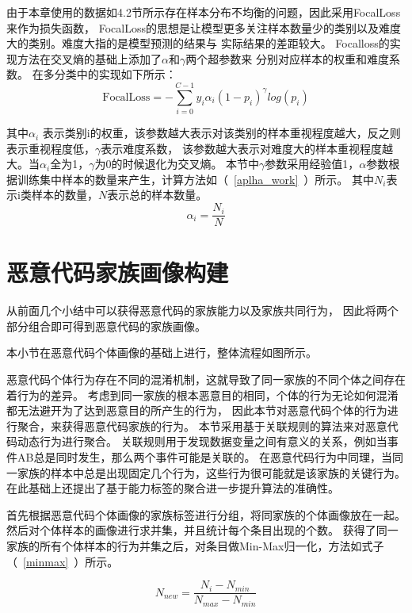 由于本章使用的数据如4.2节所示存在样本分布不均衡的问题，因此采用FocalLoss来作为损失函数，
FocalLoss的思想是让模型更多关注样本数量少的类别以及难度大的类别。难度大指的是模型预测的结果与
实际结果的差距较大。
Focalloss的实现方法在交叉熵的基础上添加了$\alpha$和$\gamma$两个超参数来
分别对应样本的权重和难度系数。
在多分类中的实现如下所示：
\begin{equation}
	\label{focalloss}
	\text{FocalLoss} = -\sum_{i=0}^{C-1}y_i \alpha_i (1-p_i)^{\gamma}log(p_i)
\end{equation}

其中$\alpha_i$ 表示类别i的权重，该参数越大表示对该类别的样本重视程度越大，反之则表示重视程度低，$\gamma$表示难度系数，
该参数越大表示对难度大的样本重视程度越大。当$\alpha_i$全为1，$\gamma$为0的时候退化为交叉熵。
本节中$\gamma$参数采用经验值1，$\alpha$参数根据训练集中样本的数量来产生，计算方法如（~\ref{aplha_work}~）所示。
其中$N_i$表示i类样本的数量，$N$表示总的样本数量。
\begin{equation}
	\label{aplha_work}
	\alpha_i = \frac{N_i}{N}
\end{equation}

\section{恶意代码家族画像构建}
从前面几个小结中可以获得恶意代码的家族能力以及家族共同行为，
因此将两个部分组合即可得到恶意代码的家族画像。

本小节在恶意代码个体画像的基础上进行，整体流程如图所示。

恶意代码个体行为存在不同的混淆机制，这就导致了同一家族的不同个体之间存在着行为的差异。
考虑到同一家族的根本恶意目的相同，个体的行为无论如何混淆都无法避开为了达到恶意目的所产生的行为，
因此本节对恶意代码个体的行为进行聚合，来获得恶意代码家族的行为。
本节采用基于关联规则的算法来对恶意代码动态行为进行聚合。
关联规则用于发现数据变量之间有意义的关系，例如当事件AB总是同时发生，那么两个事件可能是关联的。
在恶意代码行为中同理，当同一家族的样本中总是出现固定几个行为，这些行为很可能就是该家族的关键行为。
在此基础上还提出了基于能力标签的聚合进一步提升算法的准确性。

首先根据恶意代码个体画像的家族标签进行分组，将同家族的个体画像放在一起。
然后对个体样本的画像进行求并集，并且统计每个条目出现的个数。
获得了同一家族的所有个体样本的行为并集之后，对条目做Min-Max归一化，方法如式子（~\ref{minmax}~）所示。

\begin{equation}
	\label{minmax}
	N_{new} = \frac{N_i-N_{min}}{N_{max}-N_{min}}
\end{equation}

